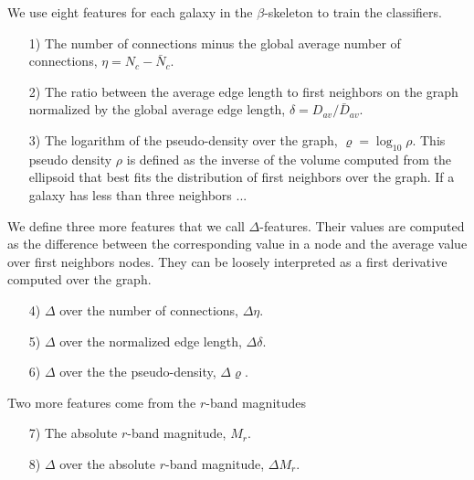 \documentclass[usenatbib]{mnras}
\begin{document}
We use eight features for each galaxy in the $\beta$-skeleton to train
the classifiers. 

\begin{enumerate}
\item[1)]
The number of connections minus the global average number of
connections, $\eta = N_c - \bar{N}_c$. 
\item[2)]
The ratio between the average edge length to first neighbors on the graph
normalized by the global average edge length, $\delta=D_{av}/\bar{D}_{av}$. 
\item[3)] 
The logarithm of the pseudo-density over the graph,
  $\varrho=\log_{10}\rho$.   
This pseudo density $\rho$ is defined as the inverse of the volume
computed from the ellipsoid that best fits the distribution of first
neighbors over the graph. 
If a galaxy has less than three neighbors ... 
\end{enumerate}
\noindent
We define three more features that we call $\Delta$-features.
Their values are computed as the difference between the corresponding
value in a node and the average value over first neighbors nodes. 
They can be loosely interpreted as a first derivative computed over
the graph. 

\begin{enumerate}
\item[4)] $\Delta$ over the number of connections, $\Delta\eta$.
\item[5)] $\Delta$ over the normalized edge length, $\Delta\delta$.
\item[6)] $\Delta$ over the the pseudo-density, $\Delta\varrho$.
\end{enumerate}

\noindent
Two more features come from the $r$-band magnitudes
\begin{enumerate}
\item[7)] The absolute $r$-band magnitude, $M_r$.
\item[8)] $\Delta$ over the absolute $r$-band magnitude, $\Delta M_r$.
\end{enumerate}
\end{document}

